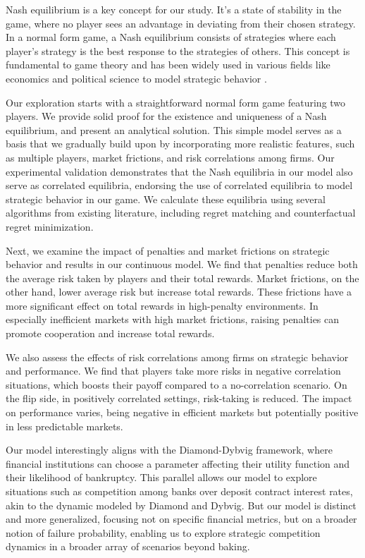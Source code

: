 \documentclass[preprint,12pt,authoryear]{elsarticle}
\theoremstyle{definition}
\begin{document}
Nash equilibrium is a key concept for our study. It's a state of stability in the game, where no player sees an advantage in deviating from their chosen strategy. In a normal form game, a Nash equilibrium consists of strategies where each player's strategy is the best response to the strategies of others. This concept is fundamental to game theory and has been widely used in various fields like economics and political science to model strategic behavior \citep{moulin1986game, varoufakis2008game}.

Our exploration starts with a straightforward normal form game featuring two players. We provide solid proof for the existence and uniqueness of a Nash equilibrium, and present an analytical solution. This simple model serves as a basis that we gradually build upon by incorporating more realistic features, such as multiple players, market frictions, and risk correlations among firms. Our experimental validation demonstrates that the Nash equilibria in our model also serve as correlated equilibria, endorsing the use of correlated equilibria to model strategic behavior in our game. We calculate these equilibria using several algorithms from existing literature, including regret matching and counterfactual regret minimization.

Next, we examine the impact of penalties and market frictions on strategic behavior and results in our continuous model. We find that penalties reduce both the average risk taken by players and their total rewards. Market frictions, on the other hand, lower average risk but increase total rewards. These frictions have a more significant effect on total rewards in high-penalty environments. In especially inefficient markets with high market frictions, raising penalties can promote cooperation and increase total rewards.

We also assess the effects of risk correlations among firms on strategic behavior and performance. We find that players take more risks in negative correlation situations, which boosts their payoff compared to a no-correlation scenario. On the flip side, in positively correlated settings, risk-taking is reduced. The impact on performance varies, being negative in efficient markets but potentially positive in less predictable markets.

Our model interestingly aligns with the Diamond-Dybvig framework, where financial institutions can choose a parameter affecting their utility function and their likelihood of bankruptcy. This parallel allows our model to explore situations such as competition among banks over deposit contract interest rates, akin to the dynamic modeled by Diamond and Dybvig. But our model is distinct and more generalized, focusing not on specific financial metrics, but on a broader notion of failure probability, enabling us to explore strategic competition dynamics in a broader array of scenarios beyond baking.
\end{document}
